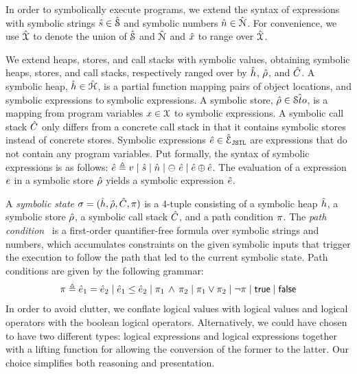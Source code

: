 In order to symbolically execute \jsil programs, we extend the syntax of \jsil expressions with 
symbolic strings $\hat{s} \in \hat{\mathcal{S}}$ and symbolic numbers $\hat{n} \in \hat{\mathcal{N}}$. 
For convenience, we use $\hat{\mathcal{X}}$ to denote the union of $\hat{\mathcal{S}}$ and $\hat{\mathcal{N}}$ 
and $\hat{x}$ to range over $\hat{\mathcal{X}}$. 


We extend heaps, stores, and call stacks with symbolic values, obtaining symbolic 
heaps, stores, and call stacks, respectively ranged over by $\hat{h}$, $\hat\rho$, and $\hat{C}$. 
A symbolic heap, $\hat{h} \in \hat{\mathcal H}$, is a partial function mapping pairs of  
object locations, and symbolic expressions to symbolic expressions. 
A symbolic store, $\hat\rho \in \hat{{\mathcal S}to}$, is a mapping from program variables 
$x \in \mathcal{X}$ to symbolic expressions.
A symbolic call stack $\hat{C}$ only differs from a concrete call stack in that it contains 
symbolic stores instead of concrete stores.
%
Symbolic expressions $\hat{e} \in \hat{\mathcal{E}}_{\mathtt{JSIL}}$ are \jsil expressions that do not contain 
any program variables. Put formally, the syntax of symbolic expressions is as follows: 
$\hat{e} \triangleq v \mid \hat{s} \mid \hat{n} \mid \ominus\ \hat{e} \mid \hat{e} \oplus \hat{e}$.
The evaluation of a \jsil expression $e$ in a symbolic store $\hat\rho$ yields a 
symbolic expression $\hat{e}$.

%
A \emph{symbolic state} $\sigma = (\hat{h}, \hat\rho, \hat{C}, \pi)$ is a 4-tuple consisting of a 
symbolic heap $\hat{h}$, a symbolic store $\hat\rho$, a symbolic call stack $\hat{C}$, and a path condition $\pi$. 
The \emph{path condition}~\cite{symb:exec:survey} is a first-order quantifier-free formula over symbolic strings and 
numbers, which accumulates constraints on the given symbolic inputs that trigger 
the execution to follow the path that led to the current symbolic state. 
Path conditions are given by the following grammar: 
\begin{equation*}
\pi \triangleq \hat{e}_1 = \hat{e}_2 \mid \hat{e}_1 \leq \hat{e}_2 \mid \pi_1 \, \wedge \, \pi_2 \mid \pi_1 \vee \pi_2 \mid \neg \pi \mid {\sf true} \mid {\sf false}
\end{equation*}
In order to avoid clutter, we conflate logical values with \jsil logical values and \jsil logical 
operators with the boolean logical operators. Alternatively, we could have chosen to 
have two different types: \jsil logical expressions and logical expressions together with a lifting 
function for allowing the conversion of the former to the latter. Our choice simplifies both reasoning 
and presentation. 

